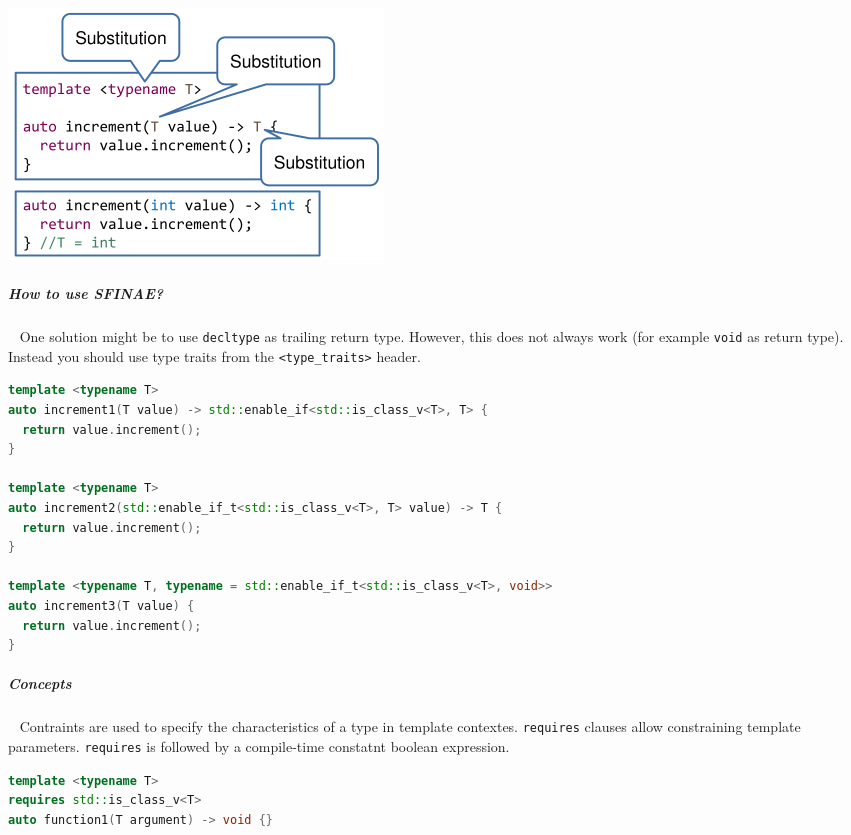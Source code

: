 \documentclass[11pt,twoside,landscape]{article}
\begin{document}
\begin{multicols}{2}
{
\begin{center}
\includegraphics[width=.9\linewidth]{img/sfinae_locations.png}
\end{center}
\label{fig:positions-for-substituion}
}
\subparagraph{How to use SFINAE?} \
\label{sec:org23adba7}
One solution might be to use \texttt{decltype} as trailing return type.
However, this does not always work (for example \texttt{void} as return type).
Instead you should use type traits from the \texttt{<type\_traits>} header.

\begin{lstlisting}[language=c++,label=lst:example-useage-for-sfinae,caption={Example useage for SFINAE},captionpos=b,numbers=none]
template <typename T>
auto increment1(T value) -> std::enable_if<std::is_class_v<T>, T> {
  return value.increment();
}

template <typename T>
auto increment2(std::enable_if_t<std::is_class_v<T>, T> value) -> T {
  return value.increment();
}

template <typename T, typename = std::enable_if_t<std::is_class_v<T>, void>>
auto increment3(T value) {
  return value.increment();
}

\end{lstlisting}

\subparagraph{Concepts} \
\label{sec:org3abfc4a}
Contraints are used to specify the characteristics of a type in template contextes.
\texttt{requires} clauses allow constraining template parameters.
\texttt{requires} is followed by a compile-time constatnt boolean expression.

\begin{lstlisting}[language=c++,label=lst:constraints-vs-sfinae,caption={constraints vs SFINAE},captionpos=b,numbers=none]
template <typename T>
requires std::is_class_v<T>
auto function1(T argument) -> void {}


\end{lstlisting}
\end{multicols}
\end{document}
